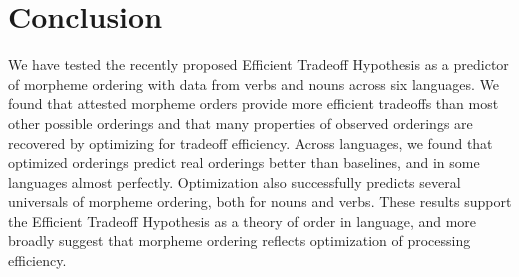 \documentclass[11pt,letterpaper]{article}
\begin{document}
\section{Conclusion}

We have tested the recently proposed Efficient Tradeoff Hypothesis as a predictor of morpheme ordering with data from verbs and nouns across six languages.
We found that attested morpheme orders provide more efficient tradeoffs than most other possible orderings and that many properties of observed orderings are recovered by optimizing for tradeoff efficiency.
Across languages, we found that optimized orderings predict real orderings better than baselines, and in some languages almost perfectly.
Optimization also successfully predicts several universals of morpheme ordering, both for nouns and verbs.
These results support the Efficient Tradeoff Hypothesis as a theory of order in language, and more broadly suggest that morpheme ordering reflects optimization of processing efficiency.


\printbibliography
\end{document}
